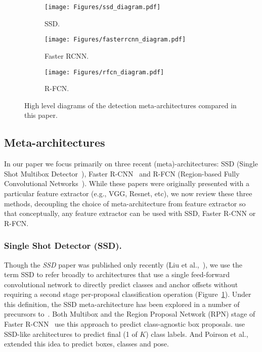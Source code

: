 \documentclass[10pt,twocolumn,letterpaper]{article}
\renewcommand{\paragraph}[1]{\subsubsection{#1}}
\begin{document}
\begin{figure*}[t!]
\begin{center}
\begin{subfigure}[t]{0.3\linewidth}
  \texttt{[image: Figures/ssd\_diagram.pdf]}
  \caption{SSD.}
\label{fig:ssd_diagram}
\end{subfigure}
\begin{subfigure}[t]{0.3\linewidth}
  \texttt{[image: Figures/fasterrcnn\_diagram.pdf]}
  \caption{Faster RCNN.}
\label{fig:fasterrcnn_diagram}
\end{subfigure}
\begin{subfigure}[t]{0.3\linewidth}
  \texttt{[image: Figures/rfcn\_diagram.pdf]}
  \caption{R-FCN.}
\label{fig:rfcn_diagram}
\end{subfigure}
\caption{
High level diagrams of the detection meta-architectures compared in this paper.
}
\end{center}
\end{figure*}



\subsection{Meta-architectures}\vspace{-2mm}
In our paper we focus primarily on three recent  (meta)-architectures: SSD (Single Shot Multibox Detector~\cite{liu2015ssd}), Faster R-CNN~\cite{ren2015faster} and R-FCN (Region-based Fully Convolutional Networks~\cite{dai2016r}).
While these papers were originally presented with a particular feature extractor (e.g., VGG, Resnet, etc), we now review these three methods, decoupling the choice of meta-architecture from feature extractor so that conceptually, any feature extractor can be used with SSD, Faster R-CNN or R-FCN.
\vspace{-3mm}
\paragraph{Single Shot Detector (SSD).}
Though the \emph{SSD} paper was published only recently (Liu et al.,~\cite{liu2015ssd}),
we use the term SSD to refer broadly to architectures that use a single feed-forward
convolutional network to directly predict classes
and anchor offsets without requiring a second stage per-proposal classification operation
(Figure~\ref{fig:ssd_diagram}).  Under this definition, the SSD meta-architecture has been explored in a number of precursors to~\cite{liu2015ssd}. Both Multibox and the Region Proposal Network (RPN) stage of Faster R-CNN~\cite{szegedy2014scalable,ren2015faster} use this approach to predict class-agnostic box proposals.  \cite{sermanet2013overfeat,redmon2015you,redmon2016yolo9000,fu2017dssd} use SSD-like architectures to predict final (1 of $K$) class labels.  And Poirson et al.,~\cite{poirson2016fast} extended this idea to predict boxes, classes and pose.
\end{document}
